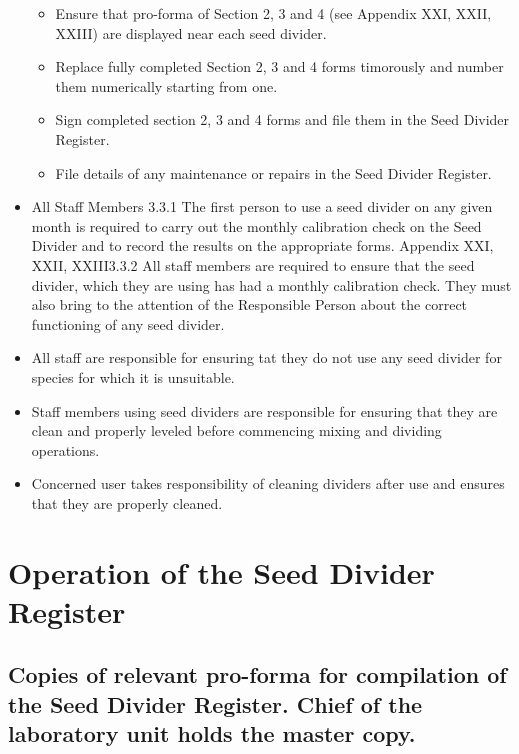 \documentclass[]{book}
\providecommand{\tightlist}{%
  \setlength{\itemsep}{0pt}\setlength{\parskip}{0pt}}
\begin{document}
\begin{itemize}
  \begin{itemize}
  \tightlist
  \item
    Ensure that pro-forma of Section 2, 3 and 4 (see Appendix XXI, XXII,
    XXIII) are displayed near each seed divider.
  \item
    Replace fully completed Section 2, 3 and 4 forms timorously and
    number them numerically starting from one.
  \item
    Sign completed section 2, 3 and 4 forms and file them in the Seed
    Divider Register.
  \item
    File details of any maintenance or repairs in the Seed Divider
    Register.
  \end{itemize}
\item
  All Staff Members 3.3.1 The first person to use a seed divider on any
  given month is required to carry out the monthly calibration check on
  the Seed Divider and to record the results on the appropriate forms.
  Appendix XXI, XXII, XXIII3.3.2 All staff members are required to
  ensure that the seed divider, which they are using has had a monthly
  calibration check. They must also bring to the attention of the
  Responsible Person about the correct functioning of any seed divider.
\item
  All staff are responsible for ensuring tat they do not use any seed
  divider for species for which it is unsuitable.
\item
  Staff members using seed dividers are responsible for ensuring that
  they are clean and properly leveled before commencing mixing and
  dividing operations.
\item
  Concerned user takes responsibility of cleaning dividers after use and
  ensures that they are properly cleaned.
\end{itemize}

\section{Operation of the Seed Divider
Register}\label{operation-of-the-seed-divider-register}

\subsection{Copies of relevant pro-forma for compilation of the Seed
Divider Register. Chief of the laboratory unit holds the master
copy.}\label{copies-of-relevant-pro-forma-for-compilation-of-the-seed-divider-register.-chief-of-the-laboratory-unit-holds-the-master-copy.}
\end{document}
